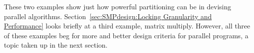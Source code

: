 These two examples show just how powerful partitioning can be in
devising parallel algorithms.
Section~\ref{sec:SMPdesign:Locking Granularity and Performance}
looks briefly at a third example, matrix multiply.
However, all three of these examples beg for more and better design
criteria for parallel programs, a topic taken up in the next section.
